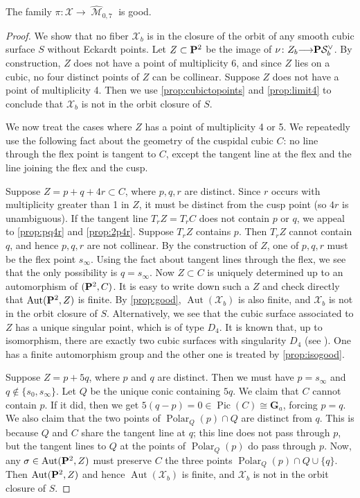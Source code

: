 \documentclass[reqno]{amsart}
\DeclareMathOperator{\Polar}{Polar}
\DeclareMathOperator{\M}{\mathcal{M}}
\renewcommand{\to}{{\longrightarrow}}
\renewcommand {\P}{{\bf P}}
\providecommand{\Aut}{\operatorname{Aut}}
\providecommand{\Pic}{\operatorname{Pic}}
\numberwithin{equation}{section}
\newcommand{\G}{\mathbf{G}}
\begin{document}
\begin{proposition}\label{prop:goodness3}
  The family $\pi \colon \mathcal{X} \to \widehat{\M}_{0,7}$ is good.
\end{proposition}
\begin{proof}
  We show that no fiber $\mathcal{X}_b$ is in the closure of the orbit of any smooth cubic surface $S$ without Eckardt points.
  Let $Z \subset \P^2$ be the image of $\nu \colon Z_b \to \P \mathcal{S}^{\vee}_b$.
  By construction, $Z$ does not have a point of multiplicity 6, and since $Z$ lies on a cubic, no four distinct points of $Z$ can be collinear.
  Suppose $Z$ does not have a point of multiplicity 4.
  Then we use \autoref{prop:cubictopoints} and \autoref{prop:limit4} to conclude that $\mathcal{X}_b$ is not in the orbit closure of $S$.

  We now treat the cases where $Z$ has a point of multiplicity 4 or 5.
  We repeatedly use the following fact about the geometry of the cuspidal cubic $C$: no line through the flex point is tangent to $C$, except the tangent line at the flex and the line joining the flex and the cusp.

  Suppose $Z = p + q + 4r \subset C$, where $p, q, r$ are distinct.
  Since $r$ occurs with multiplicity greater than 1 in $Z$, it must be distinct from the cusp point (so $4r$ is unambiguous).
  If the tangent line $T_rZ = T_rC$ does not contain $p$ or $q$, we appeal to \autoref{prop:pq4r} and \autoref{prop:2p4r}.
  Suppose $T_rZ$ contains $p$.
  Then $T_rZ$ cannot contain $q$, and hence $p, q, r$  are not collinear.
  By the construction of $Z$, one of $p,q,r$ must be the flex point $s_{\infty}$.
  Using the fact about tangent lines through the flex,  we see that the only possibility is $q = s_{\infty}$.
  Now $Z \subset C$ is uniquely determined up to an automorphism of $(\P^2, C)$.
  It is easy to write down such a $Z$ and check directly that $\Aut(\P^2, Z)$ is finite.
  By \autoref{prop:good}, $\Aut(\mathcal{X}_b)$ is also finite, and $\mathcal{X}_b$ is not in the orbit closure of $S$.
  Alternatively, we see that the cubic surface associated to $Z$ has a unique singular point, which is of type $D_4$.
  It is known that, up to isomorphism, there are exactly two cubic surfaces with singularity $D_4$ (see \cite[Lemma~4]{bru.wal:79}).
  One has a finite automorphism group and the other one is treated by \autoref{prop:isogood}.

  Suppose $Z = p + 5q$, where $p$ and $q$ are distinct.
  Then we must have $p = s_{\infty}$ and $q \not \in \{s_0, s_{\infty}\}$.
  Let $Q$ be the unique conic containing $5q$.
  We claim that $C$ cannot contain $p$.
  If it did, then we get $5(q-p) = 0 \in \Pic(C) \cong \G_a$, forcing $p = q$.
  We also claim that the two points of $\Polar_Q(p) \cap Q$ are distinct from $q$.
  This is because $Q$ and $C$ share the tangent line at $q$; this line does not pass through $p$, but the tangent lines to $Q$ at the points of $\Polar_Q(p)$ do pass through $p$.
  Now, any $\sigma \in \Aut(\P^2, Z)$ must preserve $C$ the three points $\Polar_Q(p) \cap Q \cup \{q\}$.
  Then $\Aut(\P^2, Z)$ and hence $\Aut(\mathcal{X}_b)$ is finite, and $\mathcal{X}_b$ is not in the orbit closure of $S$.
\end{proof}
\end{document}
